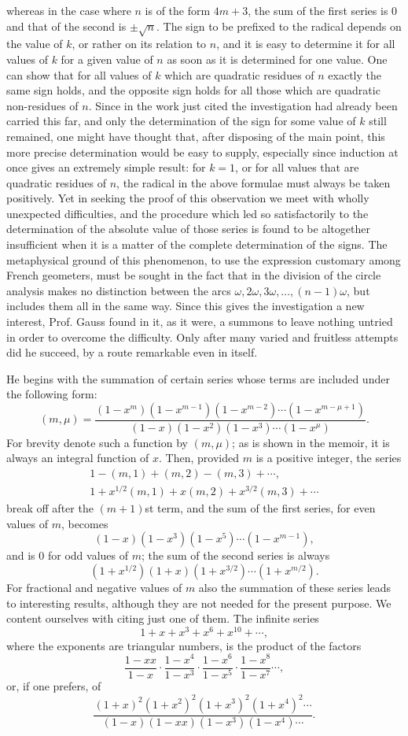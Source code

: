 \documentclass[12pt]{article}
\begin{document}
whereas in the case where $n$ is of the form $4m+3$, the sum of the first series is $0$ and that of the second is $\pm\sqrt n$. The sign to be prefixed to the radical depends on the value of $k$, or rather on its relation to $n$, and it is easy to determine it for all values of $k$ for a given value of $n$ as soon as it is determined for one value. One can show that for all values of $k$ which are quadratic residues of $n$ exactly the same sign holds, and the opposite sign holds for all those which are quadratic non-residues of $n$. Since in the work just cited the investigation had already been carried this far, and only the determination of the sign for some value of $k$ still remained, one might have thought that, after disposing of the main point, this more precise determination would be easy to supply, especially since induction at once gives an extremely simple result: for $k=1$, or for all values that are quadratic residues of $n$, the radical in the above formulae must always be taken positively. Yet in seeking the proof of this observation we meet with wholly unexpected difficulties, and the procedure which led so satisfactorily to the determination of the absolute value of those series is found to be altogether insufficient when it is a matter of the complete determination of the signs. The metaphysical ground of this phenomenon, to use the expression customary among French geometers, must be sought in the fact that in the division of the circle analysis makes no distinction between the arcs $\omega,2\omega,3\omega,
\ldots,(n-1)\omega$, but includes them all in the same way. Since this gives the investigation a new interest, Prof. Gauss found in it, as it were, a summons to leave nothing untried in order to overcome the difficulty. Only after many varied and fruitless attempts did he succeed, by a route remarkable even in itself.

He begins with the summation of certain series whose terms are included under the following form:
\[
(m,\mu)=\frac{(1-x^m)(1-x^{m-1})(1-x^{m-2})\cdots(1-x^{m-\mu+1})}{(1-x)(1-x^2)(1-x^3)\cdots(1-x^\mu)}.
\]
For brevity denote such a function by $(m,\mu)$; as is shown in the memoir, it is always an integral function of $x$. Then, provided $m$ is a positive integer, the series
\begin{align*}
1-(m,1)+(m,2)-(m,3)+\cdots,\\
1+x^{1/2}(m,1)+x(m,2)+x^{3/2}(m,3)+\cdots
\end{align*}
break off after the $(m+1)$st term, and the sum of the first series, for even values of $m$, becomes
\[
(1-x)(1-x^3)(1-x^5)\cdots(1-x^{m-1}),
\]
and is $0$ for odd values of $m$; the sum of the second series is always
\[
(1+x^{1/2})(1+x)(1+x^{3/2})\cdots(1+x^{m/2}).
\]
For fractional and negative values of $m$ also the summation of these series leads to interesting results, although they are not needed for the present purpose. We content ourselves with citing just one of them. The infinite series
\[
1+x+x^3+x^6+x^{10}+\cdots,
\]
where the exponents are triangular numbers, is the product of the factors
\[
\frac{1-xx}{1-x}\cdot\frac{1-x^4}{1-x^3}\cdot\frac{1-x^6}{1-x^5}\cdot\frac{1-x^8}{1-x^7}\cdots,
\]
or, if one prefers, of
\[
\frac{(1+x)^2(1+x^2)^2(1+x^3)^2(1+x^4)^2\cdots}{(1-x)(1-xx)(1-x^3)(1-x^4)\cdots}.
\]
\end{document}
